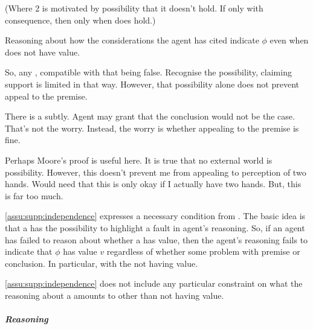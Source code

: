 \begin{note}
  {
    \color{red}
    (Where 2 is motivated by possibility that it doesn't hold. If only with consequence, then only when does hold.)
  }

    Reasoning about how the considerations the agent has cited indicate \(\phi\) even when \requ{} does not have value.

    So, any \requ{}, compatible with that being false.
    Recognise the possibility, claiming support is limited in that way.
    However, that possibility alone does not prevent appeal to the premise.

    There is a subtly.
    Agent may grant that the conclusion would not be the case.
    That's not the worry.
    Instead, the worry is whether appealing to the premise is fine.

    Perhaps Moore's proof is useful here.
    It is true that no external world is possibility.
    However, this doesn't prevent me from appealing to perception of two hands.
    Would need that this is only okay if I actually have two hands.
    But, this is far too much.

  \autoref{assu:supp:independence} expresses a necessary condition from \ideaCSB{}.
  The basic idea is that a \requ{} has the possibility to highlight a fault in agent's reasoning.
  So, if an agent has failed to reason about whether a \requ{} has {\color{red} value}, then the agent's reasoning fails to indicate that \(\phi\) has value \(v\) regardless of whether {\color{red} some problem with premise or conclusion}.
  {\color{red} In particular, with the \requ{} not having value.}

  \autoref{assu:supp:independence} does not include any particular constraint on what the reasoning about a \requ{} amounts to {\color{red} other than \requ{} not having value.}
\end{note}

\subparagraph{Reasoning}

